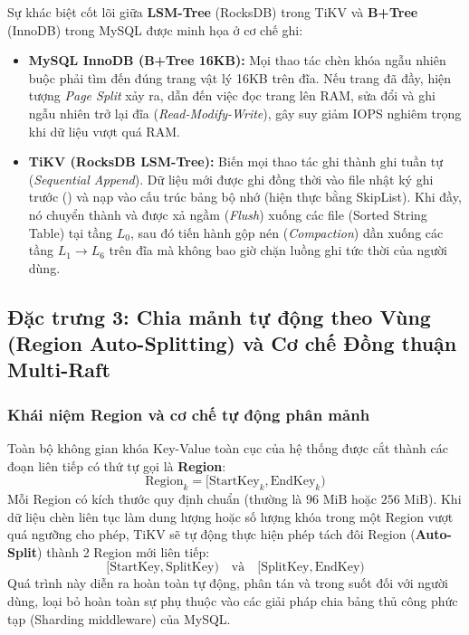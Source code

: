 Sự khác biệt cốt lõi giữa \textbf{LSM-Tree} (RocksDB) trong TiKV và \textbf{B+Tree} (InnoDB) trong MySQL được minh họa ở cơ chế ghi:
\begin{itemize}
  \item \textbf{MySQL InnoDB (B+Tree 16KB):} Mọi thao tác chèn khóa ngẫu nhiên buộc phải tìm đến đúng trang vật lý 16KB trên đĩa. Nếu trang đã đầy, hiện tượng \textit{Page Split} xảy ra, dẫn đến việc đọc trang lên RAM, sửa đổi và ghi ngẫu nhiên trở lại đĩa (\textit{Read-Modify-Write}), gây suy giảm IOPS nghiêm trọng khi dữ liệu vượt quá RAM.
  \item \textbf{TiKV (RocksDB LSM-Tree):} Biến mọi thao tác ghi thành ghi tuần tự (\textit{Sequential Append}). Dữ liệu mới được ghi đồng thời vào file nhật ký ghi trước () và nạp vào cấu trúc bảng bộ nhớ  (hiện thực bằng SkipList). Khi  đầy, nó chuyển thành  và được xả ngầm (\textit{Flush}) xuống các file  (Sorted String Table) tại tầng $L_0$, sau đó tiến hành gộp nén (\textit{Compaction}) dần xuống các tầng $L_1 \rightarrow L_6$ trên đĩa mà không bao giờ chặn luồng ghi tức thời của người dùng.
\end{itemize}

\subsection{Đặc trưng 3: Chia mảnh tự động theo Vùng (Region Auto-Splitting) và Cơ chế Đồng thuận Multi-Raft}

\subsubsection{Khái niệm Region và cơ chế tự động phân mảnh}
Toàn bộ không gian khóa Key-Value toàn cục của hệ thống được cắt thành các đoạn liên tiếp có thứ tự gọi là \textbf{Region}:
\begin{equation}
  \text{Region}_k = [\text{StartKey}_k, \text{EndKey}_k)
\end{equation}
Mỗi Region có kích thước quy định chuẩn (thường là $96\text{ MiB}$ hoặc $256\text{ MiB}$). Khi dữ liệu chèn liên tục làm dung lượng hoặc số lượng khóa trong một Region vượt quá ngưỡng cho phép, TiKV sẽ tự động thực hiện phép tách đôi Region (\textbf{Auto-Split}) thành 2 Region mới liên tiếp:
\begin{equation}
  [\text{StartKey}, \text{SplitKey}) \quad \text{và} \quad [\text{SplitKey}, \text{EndKey})
\end{equation}
Quá trình này diễn ra hoàn toàn tự động, phân tán và trong suốt đối với người dùng, loại bỏ hoàn toàn sự phụ thuộc vào các giải pháp chia bảng thủ công phức tạp (Sharding middleware) của MySQL.

